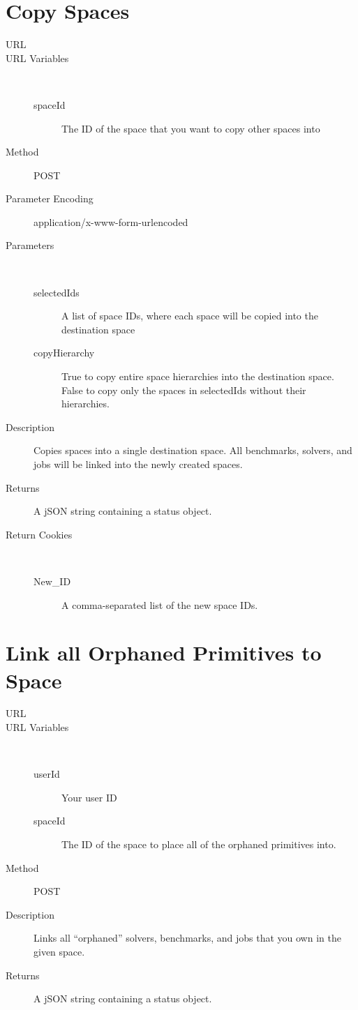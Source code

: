 \section{Copy Spaces}
\begin{description}
\item [URL] 
\item [URL Variables] \
	\begin{description}
	\item [spaceId]  The ID of the space that you want to copy other spaces into
	\end{description}
\item [Method] POST
\item [Parameter Encoding] application/x-www-form-urlencoded
\item [Parameters] \
	\begin{description}
	\item [selectedIds]  A list of space IDs, where each space will be copied into the destination space
	\item [copyHierarchy]  True to copy entire space hierarchies into the destination space. False to copy only the spaces in selectedIds without their hierarchies.
	\end{description}
\item [Description] Copies spaces into a single destination space. All benchmarks, solvers, and jobs will be linked into the newly created spaces.
\item [Returns] A jSON string containing a status object.
\item [Return Cookies] \
	\begin{description}
	\item [New\_ID] \type{Integer} A comma-separated list of the new space IDs.
	\end{description}
\end{description}

\section{Link all Orphaned Primitives to Space}
\begin{description}
\item [URL] 
\item [URL Variables] \
	\begin{description}
	\item [userId]  Your user ID
	\item [spaceId] \type{Integer} The ID of the space to place all of the orphaned primitives into.
	\end{description}
\item [Method] POST
\item [Description] Links all “orphaned” solvers, benchmarks, and jobs that you own in the given space.
\item [Returns] A jSON string containing a status object.
\end{description}

